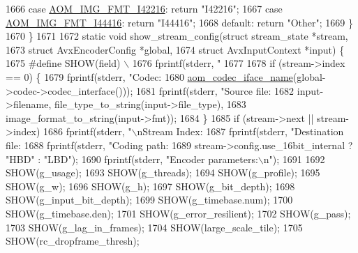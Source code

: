 \begin{DoxyCodeInclude}
{{{{{{{{{{{{{{{{{{{{{{{{{1666     \textcolor{keywordflow}{case} \hyperlink{aom__image_8h_a930317c04b4bd0a660bb5e744055523ca064683ed4260fc6244af6cfc9d261c22}{AOM\_IMG\_FMT\_I42216}: \textcolor{keywordflow}{return} \textcolor{stringliteral}{"I42216"};
1667     \textcolor{keywordflow}{case} \hyperlink{aom__image_8h_a930317c04b4bd0a660bb5e744055523cab9b93d397dedbdd6bfafec84d1f8f0f5}{AOM\_IMG\_FMT\_I44416}: \textcolor{keywordflow}{return} \textcolor{stringliteral}{"I44416"};
1668     \textcolor{keywordflow}{default}: \textcolor{keywordflow}{return} \textcolor{stringliteral}{"Other"};
1669   \}
1670 \}
1671 
1672 \textcolor{keyword}{static} \textcolor{keywordtype}{void} show\_stream\_config(\textcolor{keyword}{struct} stream\_state *stream,
1673                                \textcolor{keyword}{struct} AvxEncoderConfig *global,
1674                                \textcolor{keyword}{struct} AvxInputContext *input) \{
1675 \textcolor{preprocessor}{#define SHOW(field) \(\backslash\)}
1676 \textcolor{preprocessor}{  fprintf(stderr, "    %
1677 
1678   \textcolor{keywordflow}{if} (stream->index == 0) \{
1679     fprintf(stderr, \textcolor{stringliteral}{"Codec: %
1680             \hyperlink{group__codec_ga013b1f6d96b2cf9489396311a7e5179b}{aom\_codec\_iface\_name}(global->codec->codec\_interface()));
1681     fprintf(stderr, \textcolor{stringliteral}{"Source file: %
1682             input->filename, file\_type\_to\_string(input->file\_type),
1683             image\_format\_to\_string(input->fmt));
1684   \}
1685   \textcolor{keywordflow}{if} (stream->next || stream->index)
1686     fprintf(stderr, \textcolor{stringliteral}{"\(\backslash\)nStream Index: %
1687   fprintf(stderr, \textcolor{stringliteral}{"Destination file: %
1688   fprintf(stderr, \textcolor{stringliteral}{"Coding path: %
1689           stream->config.use\_16bit\_internal ? \textcolor{stringliteral}{"HBD"} : \textcolor{stringliteral}{"LBD"});
1690   fprintf(stderr, \textcolor{stringliteral}{"Encoder parameters:\(\backslash\)n"});
1691 
1692   SHOW(g\_usage);
1693   SHOW(g\_threads);
1694   SHOW(g\_profile);
1695   SHOW(g\_w);
1696   SHOW(g\_h);
1697   SHOW(g\_bit\_depth);
1698   SHOW(g\_input\_bit\_depth);
1699   SHOW(g\_timebase.num);
1700   SHOW(g\_timebase.den);
1701   SHOW(g\_error\_resilient);
1702   SHOW(g\_pass);
1703   SHOW(g\_lag\_in\_frames);
1704   SHOW(large\_scale\_tile);
1705   SHOW(rc\_dropframe\_thresh);
}}}}}}}}}}}}}}}}}}}}}}}}}}}}}}}
\end{DoxyCodeInclude}
